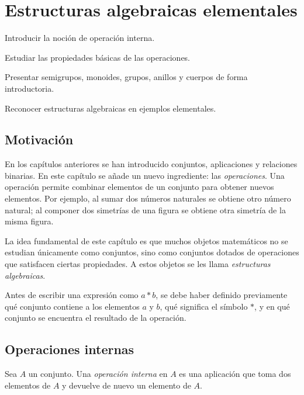 \chapter{Estructuras algebraicas elementales}

\begin{objetivos}
  \item Introducir la noción de operación interna.
  \item Estudiar las propiedades básicas de las operaciones.
  \item Presentar semigrupos, monoides, grupos, anillos y cuerpos de forma introductoria.
  \item Reconocer estructuras algebraicas en ejemplos elementales.
\end{objetivos}

\section{Motivación}

En los capítulos anteriores se han introducido conjuntos, aplicaciones y relaciones binarias. En este capítulo se añade un nuevo ingrediente: las \emph{operaciones}. Una operación permite combinar elementos de un conjunto para obtener nuevos elementos. Por ejemplo, al sumar dos números naturales se obtiene otro número natural; al componer dos simetrías de una figura se obtiene otra simetría de la misma figura.

La idea fundamental de este capítulo es que muchos objetos matemáticos no se estudian únicamente como conjuntos, sino como conjuntos dotados de operaciones que satisfacen ciertas propiedades. A estos objetos se les llama \emph{estructuras algebraicas}.

\begin{convencion}
Antes de escribir una expresión como \(a*b\), se debe haber definido previamente qué conjunto contiene a los elementos \(a\) y \(b\), qué significa el símbolo \(*\), y en qué conjunto se encuentra el resultado de la operación.
\end{convencion}

\section{Operaciones internas}

Sea \(A\) un conjunto. Una \emph{operación interna} en \(A\) es una aplicación que toma dos elementos de \(A\) y devuelve de nuevo un elemento de \(A\).

